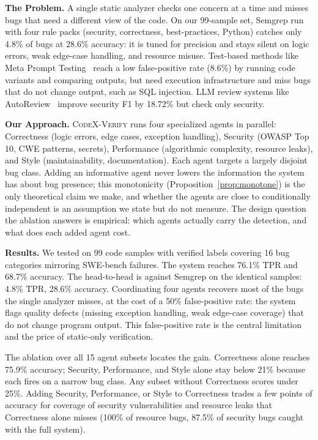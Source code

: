 \documentclass[10pt,twocolumn]{article}
\begin{document}
\textbf{The Problem.} A single static analyzer checks one concern at a time and misses bugs that need a different view of the code. On our 99-sample set, Semgrep run with four rule packs (security, correctness, best-practices, Python) catches only 4.8\% of bugs at 28.6\% accuracy: it is tuned for precision and stays silent on logic errors, weak edge-case handling, and resource misuse. Test-based methods like Meta Prompt Testing~\cite{wang2024metamorphic} reach a low false-positive rate (8.6\%) by running code variants and comparing outputs, but need execution infrastructure and miss bugs that do not change output, such as SQL injection. LLM review systems like AutoReview~\cite{autoreview2025} improve security F1 by 18.72\% but check only security.

\textbf{Our Approach.} \textsc{CodeX-Verify} runs four specialized agents in parallel: Correctness (logic errors, edge cases, exception handling), Security (OWASP Top 10, CWE patterns, secrets), Performance (algorithmic complexity, resource leaks), and Style (maintainability, documentation). Each agent targets a largely disjoint bug class. Adding an informative agent never lowers the information the system has about bug presence; this monotonicity (Proposition~\ref{prop:monotone}) is the only theoretical claim we make, and whether the agents are close to conditionally independent is an assumption we state but do not measure. The design question the ablation answers is empirical: which agents actually carry the detection, and what does each added agent cost.

\textbf{Results.} We tested on 99 code samples with verified labels covering 16 bug categories mirroring SWE-bench failures. The system reaches 76.1\% TPR and 68.7\% accuracy. The head-to-head is against Semgrep on the identical samples: 4.8\% TPR, 28.6\% accuracy. Coordinating four agents recovers most of the bugs the single analyzer misses, at the cost of a 50\% false-positive rate: the system flags quality defects (missing exception handling, weak edge-case coverage) that do not change program output. This false-positive rate is the central limitation and the price of static-only verification.

The ablation over all 15 agent subsets locates the gain. Correctness alone reaches 75.9\% accuracy; Security, Performance, and Style alone stay below 21\% because each fires on a narrow bug class. Any subset without Correctness scores under 25\%. Adding Security, Performance, or Style to Correctness trades a few points of accuracy for coverage of security vulnerabilities and resource leaks that Correctness alone misses (100\% of resource bugs, 87.5\% of security bugs caught with the full system).
\end{document}
